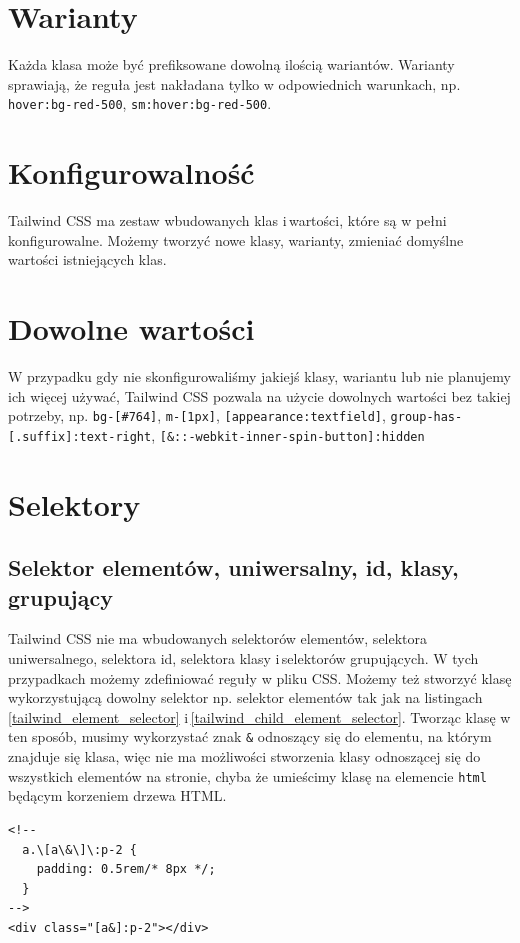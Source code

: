 \documentclass[a4paper,12pt]{book} %
\begin{document}
\section{Warianty}
Każda klasa może być prefiksowane dowolną ilością wariantów. Warianty sprawiają, że reguła jest nakładana tylko w odpowiednich warunkach, np. \lstinline|hover:bg-red-500|, \lstinline|sm:hover:bg-red-500|.

\section{Konfigurowalność}
Tailwind CSS ma zestaw wbudowanych klas i\,wartości, które są w pełni konfigurowalne. Możemy tworzyć nowe klasy, warianty, zmieniać domyślne wartości istniejących klas.

\section{Dowolne wartości}
W przypadku gdy nie skonfigurowaliśmy jakiejś klasy, wariantu lub nie planujemy ich więcej używać, Tailwind CSS pozwala na użycie dowolnych wartości bez takiej potrzeby, np. \lstinline|bg-[#764]|, \lstinline|m-[1px]|, \lstinline|[appearance:textfield]|, \lstinline|group-has-[.suffix]:text-right|, \lstinline|[&::-webkit-inner-spin-button]:hidden|
\section{Selektory}
\subsection{Selektor elementów, uniwersalny, id, klasy, grupujący}
Tailwind CSS nie ma wbudowanych selektorów elementów, selektora uniwersalnego, selektora id, selektora klasy i\,selektorów grupujących. W tych przypadkach możemy zdefiniować reguły w pliku CSS. Możemy też stworzyć klasę wykorzystującą dowolny selektor np. selektor elementów tak jak na listingach \ref{tailwind_element_selector} i\,\ref{tailwind_child_element_selector}. Tworząc klasę w ten sposób, musimy wykorzystać znak \lstinline|&| odnoszący się do elementu, na którym znajduje się klasa, więc nie ma możliwości stworzenia klasy odnoszącej się do wszystkich elementów na stronie, chyba że umieścimy klasę na elemencie \lstinline|html| będącym korzeniem drzewa HTML.


\begin{lstfloat}[hb]
  \lstset{language=HTML}
  \begin{lstlisting}[frame=single]
<!--
  a.\[a\&\]\:p-2 {
    padding: 0.5rem/* 8px */;
  }
-->
<div class="[a&]:p-2"></div>
\end{lstlisting}
  \caption{Klasa zmieniająca padding dla elementu będącego elementem \lstinline|a|}\label{tailwind_element_selector}
\end{lstfloat}
\end{document}

